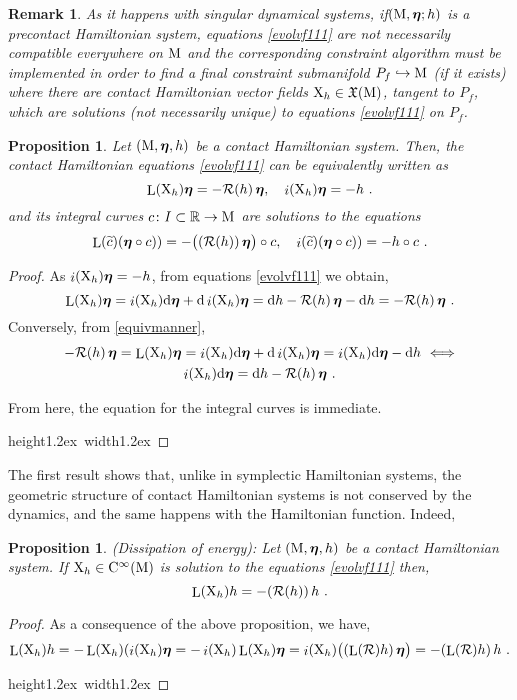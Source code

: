 \documentclass[12pt]{report}
\newtheorem{prop}[teor]{Proposition}
\newtheorem{remark}[teor]{Remark}
\def\beq{\begin{equation}}
\def\eeq{\end{equation}}
\def\qed{\ifvmode\removelastskip\fi
{\unskip\nobreak\hfil\penalty50\hbox{}\nobreak\hfil
\hbox{\vrule height1.2ex width1.2ex}\parfillskip=0pt
\finalhyphendemerits=0 \par\smallskip}}
\def\vf{\mathfrak X}
\def\d{{\rm d}}
\def\Real{\mathbb{R}}
\def\bmeta{\mbox{\boldmath $\eta$}}
\def\X{{\rm X}}
\def\Lie{\mathop{\rm L}\nolimits}
\def\inn{\mathop{i}\nolimits}
\def\Cinfty{{\rm C}^\infty}
\newcommand{\Reeb}{\mathcal{R}}
\begin{document}
\begin{remark}{\rm 
As it happens with singular dynamical systems,
if$({\rm M},\bmeta;h)$ is a precontact Hamiltonian system,
equations \eqref{evolvf111} are not necessarily compatible everywhere on ${\rm M}$ 
and the corresponding constraint algorithm must be implemented in order to find 
a {\sl final constraint submanifold} $P_f\hookrightarrow {\rm M}$
(if it exists) where there are contact Hamiltonian vector fields $\X_h\in\vf({\rm M})$,
tangent to $P_f$, which are solutions (not necessarily unique) to equations \eqref{evolvf111} on $P_f$.
}\end{remark}

\begin{prop}
Let $({\rm M},\bmeta,h)$ be a contact Hamiltonian system.
Then, the contact Hamiltonian equations \eqref{evolvf111} can be equivalently written as
\begin{equation}
 \Lie(\X_h)\bmeta= -\Reeb(h)\,\bmeta ,\quad  \inn(\X_h)\bmeta = -h \ .
 \label{equivmanner}
\end{equation}
and its integral curves $c\colon I\subset\Real\to {\rm M}$  are solutions to the equations
\begin{equation*}
 \Lie(\widetilde c)(\bmeta\circ c))= -\big((\Reeb(h))\,\bmeta\big)\circ c ,\quad  \inn(\widetilde c)(\bmeta\circ c)) = -h\circ c  \ .
\end{equation*}
\end{prop}
\begin{proof}
As $\inn(\X_h)\bmeta=-h$, from equations \eqref{evolvf111} we obtain,
$$
\Lie(\X_h)\bmeta=
\inn(\X_h)\d\bmeta+\d\inn(\X_h)\bmeta=
\d h-\Reeb(h)\,\bmeta-\d h=-\Reeb(h)\,\bmeta \ .
$$
Conversely, from \eqref{equivmanner},
\begin{multline*}
-\Reeb(h)\,\bmeta=\Lie(\X_h)\bmeta= 
\inn(\X_h)\d\bmeta+\d\inn(\X_h)\bmeta=
\inn(\X_h)\d\bmeta-\d h \ \Longleftrightarrow \\
\inn(\X_h)\d\bmeta=\d h-\Reeb(h)\,\bmeta \ .
\end{multline*}


From here, the equation for the integral curves is immediate. 
\\ \qed\end{proof}

The first result shows that,
unlike in symplectic Hamiltonian systems, the geometric structure of contact Hamiltonian systems is not conserved by the dynamics,
and the same happens with the Hamiltonian function. Indeed,

\begin{prop} {\rm (Dissipation of energy):}
Let $({\rm M},\bmeta,h)$ be a contact Hamiltonian system. If $\X_h\in\Cinfty({\rm M})$ is solution to the equations \eqref{evolvf111} then,
\beq
\Lie(\X_h)h=-(\Reeb(h))\,h \ .
\label{eq:disipenerg}
\eeq
\label{disipenerg}
\end{prop}
\vspace{-1cm}
\begin{proof}
As a consequence of the above proposition, we have,
$$
\Lie(\X_h)h=-\Lie(\X_h)(\inn(\X_h)\bmeta=
-\inn(\X_h)\Lie(\X_h)\bmeta=
\inn(\X_h)\big((\Lie(\Reeb)h)\,\bmeta\big)=-(\Lie(\Reeb)h)\,h\ .
$$
\qed\end{proof}
\end{document}
